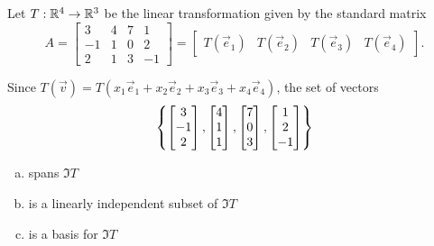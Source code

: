 \begin{activity}{5}
Let $T: \mathbb{R}^4 \rightarrow \mathbb{R}^3$ be the linear transformation given by the
standard matrix
\[
  A
    =
  \begin{bmatrix} 3 & 4 & 7 & 1\\ -1 & 1 & 0 & 2 \\ 2 & 1 & 3 & -1 \end{bmatrix}
    =
  \begin{bmatrix}T(\vec e_1)&T(\vec e_2)&T(\vec e_3)&T(\vec e_4)\end{bmatrix}
.\]

Since \(T(\vec v)=T(x_1\vec e_1+x_2\vec e_2+x_3\vec e_3+x_4\vec e_4)\),
the set of vectors
\[
  \left\{
    \begin{bmatrix}3\\-1\\2\end{bmatrix},
    \begin{bmatrix}4\\1\\1\end{bmatrix},
    \begin{bmatrix}7\\0\\3\end{bmatrix},
    \begin{bmatrix}1\\2\\-1\end{bmatrix}
  \right\}
\]
\begin{enumerate}[a)]
\item spans \(\Im T\)
\item is a linearly independent subset of \(\Im T\)
\item is a basis for \(\Im T\)
\end{enumerate}
\end{activity}


